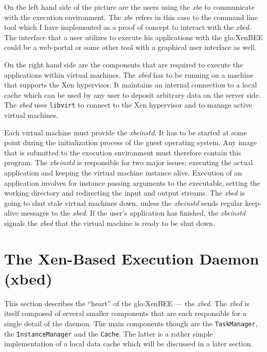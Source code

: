 On the left hand side of the picture are the users using the \emph{xbe} to
communicate with the execution  environment. The \emph{xbe} refers in this
case  to the command  line tool  which I  have implemented  as a  proof of
concept  to interact  with the  \emph{xbed}.  The  interface that  a user
utilizes to execute his applications  with the \gls{glo:XenBEE} could be a
web-portal or some other tool with a graphical user interface as well.

\medskip

On the right hand side are the components that are required to execute the
applications within  virtual machines.  The \emph{xbed} has  to be running
on a machine  that supports the Xen hypervisor.   It maintains an internal
connection  to a local  cache which  can be  used by  any user  to deposit
arbitrary data on the  server side.  The \emph{xbed} uses \texttt{libvirt}
to connect to the Xen hypervisor and to manage active virtual machines.

Each  virtual machine  must  provide  the \emph{xbeinstd}.  It  has to  be
started  at some  point during  the  initialization process  of the  guest
operating system. Any image that is submitted to the execution environment
must therefore  contain this  program. The \emph{xbeinstd}  is responsible
for two  major issues:  executing the actual  application and  keeping the
virtual machine instance alive.   Execution of an application involves for
instance  passing  arguments  to   the  executable,  setting  the  working
directory and redirecting the input and output streams. The \emph{xbed} is
going  to shut  stale virtual  machines down,  unless  the \emph{xbeinstd}
sends  regular keep-alive  messages  to the  \emph{xbed}.   If the  user's
application has finished, the \emph{xbeinstd} signals the \emph{xbed} that
the virtual machine is ready to be shut down.

\section[The Xen-Based Execution Daemon]{The Xen-Based Execution Daemon (xbed)}
\label{sec:xbed}

This  section describes  the  ``heart'' of  the  \gls{glo:XenBEE} ---  the
\emph{xbed}.   The  \emph{xbed}  is  itself composed  of  several  smaller
components that  are each responsible for  a single detail  of the daemon.
The   main   components   though   are   the   \texttt{TaskManager},   the
\texttt{InstanceManager} and  the \texttt{Cache}.  The latter  is a rather
simple implementation of  a local data cache which will  be discussed in a
later section.

